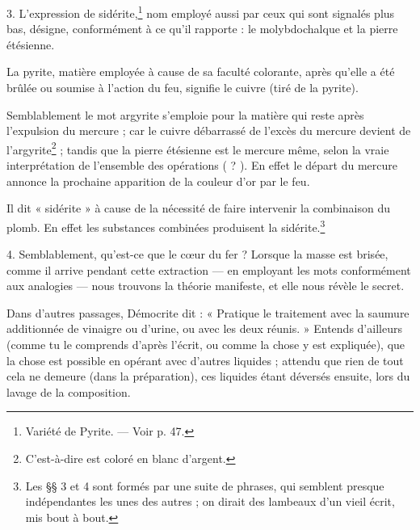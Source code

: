 \documentclass[a4paper, 11pt, oneside, polutonikogreek, french]{article}
\begin{document}
3. L'expression de sidérite,\footnote{Variété de Pyrite. --- Voir p. 47.} nom employé aussi par ceux qui sont signalés plus bas, désigne, conformément à ce qu'il rapporte : le molybdochalque et la pierre étésienne.

La pyrite, matière employée à cause de sa faculté colorante, après qu'elle a été brûlée ou soumise à l'action du feu, signifie le cuivre (tiré de la pyrite).

Semblablement le mot argyrite s'emploie pour la matière qui reste après l'expulsion du mercure ; car le cuivre débarrassé de l'excès du mercure devient de l'argyrite\footnote{C'est-à-dire est coloré en blanc d'argent.} ; tandis que la pierre étésienne est le mercure même, selon la vraie interprétation de l'ensemble des opérations ( ? ). En effet le départ du mercure annonce la prochaine apparition de la couleur d'or par le feu.

Il dit « sidérite » à cause de la nécessité de faire intervenir la combinaison du plomb. En effet les substances combinées produisent la sidérite.\footnote{Les §§ 3 et 4 sont formés par une suite de phrases, qui semblent presque indépendantes les unes des autres ; on dirait des lambeaux d'un vieil écrit, mis bout à bout.}

4. Semblablement, qu'est-ce que le cœur du fer ? Lorsque la masse est brisée, comme il arrive pendant cette extraction --- en employant les mots conformément aux analogies --- nous trouvons la théorie manifeste, et elle nous révèle le secret.

Dans d'autres passages, Démocrite dit : « Pratique le traitement avec la saumure additionnée de vinaigre ou d'urine, ou avec les deux réunis. » Entends d'ailleurs (comme tu le comprends d'après l'écrit, ou comme la chose y est expliquée), que la chose est possible en opérant avec d'autres liquides ; attendu que rien de tout cela ne demeure (dans la préparation), ces liquides étant déversés ensuite, lors du lavage de la composition.
\end{document}

